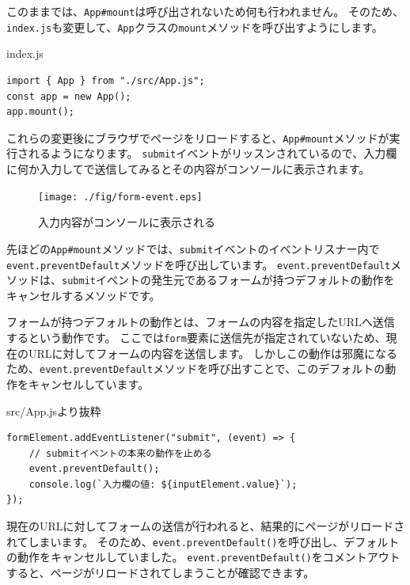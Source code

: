 このままでは、\texttt{App\#mount}は呼び出されないため何も行われません。
そのため、\texttt{index.js}も変更して、\texttt{App}クラスの\texttt{mount}メソッドを呼び出すようにします。

\begin{listtitle}
index.js
\end{listtitle}
\begin{lstlisting}
import { App } from "./src/App.js";
const app = new App();
app.mount();
\end{lstlisting}
\listend

これらの変更後にブラウザでページをリロードすると、\texttt{App\#mount}メソッドが実行されるようになります。
\texttt{submit}イベントがリッスンされているので、入力欄に何か入力してで送信してみるとその内容がコンソールに表示されます。

\begin{figure}[h]
\centering
\texttt{[image: ./fig/form-event.eps]}
\caption{入力内容がコンソールに表示される}
\end{figure}

先ほどの\texttt{App\#mount}メソッドでは、\texttt{submit}イベントのイベントリスナー内で\texttt{event.preventDefault}メソッドを呼び出しています。
\texttt{event.preventDefault}メソッドは、\texttt{submit}イベントの発生元であるフォームが持つデフォルトの動作をキャンセルするメソッドです。

フォームが持つデフォルトの動作とは、フォームの内容を指定したURLへ送信するという動作です。
ここでは\texttt{form}要素に送信先が指定されていないため、現在のURLに対してフォームの内容を送信します。
しかしこの動作は邪魔になるため、\texttt{event.preventDefault}メソッドを呼び出すことで、このデフォルトの動作をキャンセルしています。

\begin{listtitle}
src/App.jsより抜粋
\end{listtitle}
\begin{lstlisting}
formElement.addEventListener("submit", (event) => {
    // submitイベントの本来の動作を止める
    event.preventDefault();
    console.log(`入力欄の値: ${inputElement.value}`);
});
\end{lstlisting}
\listend

現在のURLに対してフォームの送信が行われると、結果的にページがリロードされてしまいます。
そのため、\texttt{event.preventDefault()}を呼び出し、デフォルトの動作をキャンセルしていました。
\texttt{event.preventDefault()}をコメントアウトすると、ページがリロードされてしまうことが確認できます。

